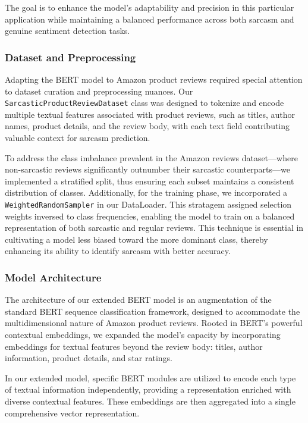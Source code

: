 \documentclass[10pt,twocolumn,letterpaper]{article}
\begin{document}
The goal is to enhance the model's adaptability and precision in this particular application while maintaining a balanced performance across both sarcasm and genuine sentiment detection tasks.

\subsubsection{Dataset and Preprocessing}
Adapting the BERT model to Amazon product reviews required special attention to dataset curation and preprocessing nuances. Our \texttt{SarcasticProductReviewDataset} class was designed to tokenize and encode multiple textual features associated with product reviews, such as titles, author names, product details, and the review body, with each text field contributing valuable context for sarcasm prediction.

To address the class imbalance prevalent in the Amazon reviews dataset—where non-sarcastic reviews significantly outnumber their sarcastic counterparts—we implemented a stratified split, thus ensuring each subset maintains a consistent distribution of classes. Additionally, for the training phase, we incorporated a \texttt{WeightedRandomSampler} in our DataLoader. This stratagem assigned selection weights inversed to class frequencies, enabling the model to train on a balanced representation of both sarcastic and regular reviews. This technique is essential in cultivating a model less biased toward the more dominant class, thereby enhancing its ability to identify sarcasm with better accuracy.

\subsubsection{Model Architecture}

The architecture of our extended BERT model is an augmentation of the standard BERT sequence classification framework, designed to accommodate the multidimensional nature of Amazon product reviews. Rooted in BERT's powerful contextual embeddings, we expanded the model's capacity by incorporating embeddings for textual features beyond the review body: titles, author information, product details, and star ratings. 

In our extended model, specific BERT modules are utilized to encode each type of textual information independently, providing a representation enriched with diverse contextual features. These embeddings are then aggregated into a single comprehensive vector representation.
\end{document}
